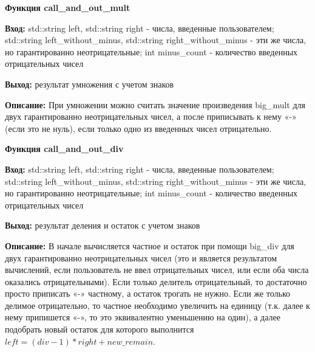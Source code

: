 \textbf{Функция call\_and\_out\_mult } \par
\textbf{Вход:} std::string left, std::string right - числа, введенные пользователем; std::string left\_without\_minus, std::string right\_without\_minus - эти же числа, но гарантированно неотрицательные; int minus\_count - количество введенных отрицательных чисел\par
\textbf{Выход:} результат умножения с учетом знаков\par
\textbf{Описание:} При умножении можно считать значение произведения big\_mult для двух гарантированно неотрицательных чисел, а после приписывать к нему «-» (если это не нуль), если только одно из введенных чисел отрицательно.\par
\vspace{10pt}

\textbf{Функция call\_and\_out\_div } \par
\textbf{Вход:} std::string left, std::string right - числа, введенные пользователем; std::string left\_without\_minus, std::string right\_without\_minus - эти же числа, но гарантированно неотрицательные; int minus\_count - количество введенных отрицательных чисел \par
\textbf{Выход:} результат деления и остаток с учетом знаков\par
\textbf{Описание:} В начале вычисляется частное и остаток при помощи big\_div для двух гарантированно неотрицательных чисел (это и является результатом вычислений, если пользователь не ввел отрицательных чисел, или если оба числа оказались отрицательными). Если только делитель отрицательный, то достаточно просто приписать «-» частному, а остаток трогать не нужно. Если же только делимое отрицательно, то частное необходимо увеличить на единицу (т.к. далее к нему припишется «-», то это эквивалентно уменьшению на один), а далее подобрать новый остаток для которого выполнится $left = (div-1) * right + new\_remain$.\par
\vspace{10pt}

